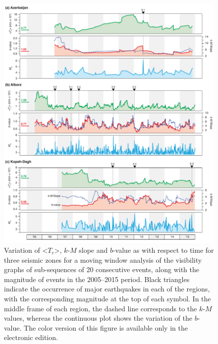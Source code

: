 \begin{figure}%
	\centering
	\includegraphics[width=\textwidth]{figures/pdf/figure-09} 
	\caption{Variation of <$T_c$>, $k$-$M$ slope and $b$-value as with respect to time for three seismic zones for a moving window analysis of the visibility graphs of sub-sequences of 20 consecutive events, along with the magnitude of events in the 2005--2015 period. Black triangles indicate the occurrence of major earthquakes in each of the regions, with the corresponding magnitude at the top of each symbol. In the middle frame of each region, the dashed line corresponds to the $k$-$M$ values, whereas the continuous plot shows the variation of the $b$-value. The color version of this figure is available only in the electronic edition.}
	\label{fig:tc}
\end{figure}

